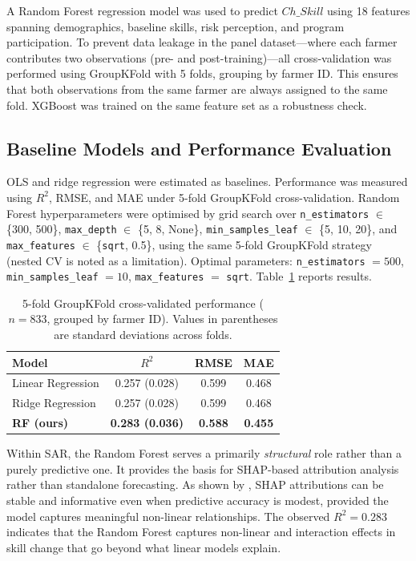 \documentclass[3p,twocolumn,authoryear]{elsarticle}
\begin{document}
A Random Forest regression model \citep{breiman2001} was used to predict
$Ch\_Skill$ using 18 features spanning demographics, baseline skills,
risk perception, and program participation.
To prevent data leakage in the panel dataset---where each farmer
contributes two observations (pre- and post-training)---all
cross-validation was performed using GroupKFold with 5 folds, grouping
by farmer ID.
This ensures that both observations from the same farmer are always
assigned to the same fold.
XGBoost \citep{chen2016} was trained on the same feature set as a
robustness check.

\subsection{Baseline Models and Performance Evaluation}

OLS and ridge regression were estimated as baselines.
Performance was measured using $R^{2}$, RMSE, and MAE under 5-fold
GroupKFold cross-validation.
Random Forest hyperparameters were optimised by grid search over
\texttt{n\_estimators} $\in$ \{300, 500\},
\texttt{max\_depth} $\in$ \{5, 8, None\},
\texttt{min\_samples\_leaf} $\in$ \{5, 10, 20\}, and
\texttt{max\_features} $\in$ \{\texttt{sqrt}, 0.5\}, using the same
5-fold GroupKFold strategy (nested CV is noted as a limitation).
Optimal parameters: \texttt{n\_estimators} $= 500$,
\texttt{min\_samples\_leaf} $= 10$,
\texttt{max\_features} $=$ \texttt{sqrt}.
Table~\ref{tab:baseline_performance} reports results.

\begin{table}[htbp]
\centering
\caption{5-fold GroupKFold cross-validated performance ($n = 833$,
grouped by farmer ID). Values in parentheses are standard deviations
across folds.}
\label{tab:baseline_performance}
\begin{tabular}{@{}lccc@{}}
\toprule
\textbf{Model} & \textbf{$R^{2}$} & \textbf{RMSE} & \textbf{MAE} \\
\midrule
Linear Regression  & 0.257 (0.028) & 0.599 & 0.468 \\
Ridge Regression   & 0.257 (0.028) & 0.599 & 0.468 \\
\textbf{RF (ours)} & \textbf{0.283 (0.036)} & \textbf{0.588} & \textbf{0.455} \\
\bottomrule
\end{tabular}
\end{table}

Within SAR, the Random Forest serves a primarily \textit{structural}
role rather than a purely predictive one.
It provides the basis for SHAP-based attribution analysis rather than
standalone forecasting.
As shown by \citet{lundberg2020}, SHAP attributions can be stable and
informative even when predictive accuracy is modest, provided the model
captures meaningful non-linear relationships.
The observed $R^{2} = 0.283$ indicates that the Random Forest captures
non-linear and interaction effects in skill change that go beyond what
linear models explain.
\end{document}
